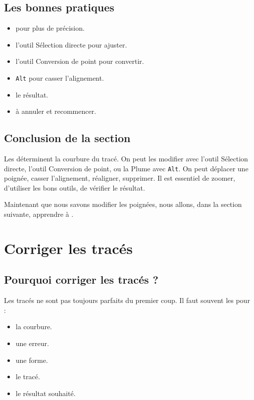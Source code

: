 \subsection{Les bonnes pratiques}

\begin{itemize}
    \item {} pour plus de précision.
    \item {} l'outil Sélection directe pour ajuster.
    \item {} l'outil Conversion de point pour convertir.
    \item {} \texttt{Alt} pour casser l'alignement.
    \item {} le résultat.
    \item {} à annuler et recommencer.
\end{itemize}

\subsection*{Conclusion de la section}

Les  déterminent la courbure du tracé. On peut les modifier avec l'outil Sélection directe, l'outil Conversion de point, ou la Plume avec \texttt{Alt}. On peut déplacer une poignée, casser l'alignement, réaligner, supprimer. Il est essentiel de zoomer, d'utiliser les bons outils, de vérifier le résultat.

Maintenant que nous savons modifier les poignées, nous allons, dans la section suivante, apprendre à .

\section{Corriger les tracés}

\subsection{Pourquoi corriger les tracés ?}

Les tracés ne sont pas toujours parfaits du premier coup. Il faut souvent les  pour :

\begin{itemize}
    \item {} la courbure.
    \item {} une erreur.
    \item {} une forme.
    \item {} le tracé.
    \item {} le résultat souhaité.
\end{itemize}

